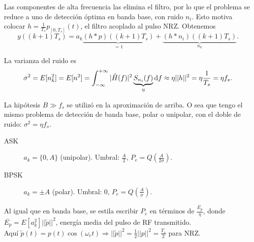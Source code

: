 Las componentes de alta frecuencia las elimina el filtro, por lo
que el problema se reduce a uno de detección óptima en banda base,
con ruido $n_i$. Esto  motiva colocar $h=\frac{1}{T_s}
p_{[0,T_s]}(t)$, el filtro acoplado al pulso NRZ. Obtenemos
\[y((k+1)T_s) = a_k \underbrace{(h\ast p)((k+1)T_s)}_{=1} + \underbrace{(h\ast n_i)((k+1)T_s)}_{n_k}.\]
\begin{center}
\end{center}
La varianza del ruido es
\[\sigma^2=E[n_k^2] = E[n^2] = \int_{-\infty}^{+\infty}|\hat{H}(f)|^2\underbrace{S_{n_i}(f)}_{\eta}\mathrm{d} f \approx \eta ||h||^2 = \eta\frac{1}{T_s} = \eta f_s.\]

La hipótesis $B\gg f_s$ se utilizó en la aproximación de arriba. %
 O sea que tengo el mismo problema
de detección de banda base, polar o unipolar, con el doble de
ruido: $\sigma^2=\eta f_s$.



\begin{description}
    \item[ASK] $a_k=\{0,A\}$ (unipolar). Umbral: $\frac{A}{2}$,
    $P_e=Q\left(\frac{A}{2\sigma}\right)$.
    \item[BPSK] $a_k=\pm A$ (polar). Umbral: $0$,
    $P_e=Q\left(\frac{A}{\sigma}\right)$.
 \end{description}

Al igual que en banda base, se estila escribir $P_e$ en términos de
$\frac{\overline{E_p}}{\eta}$, donde $\overline{E_p} =
E[a_k^2]||\tilde{p}||^2$, energía media del pulso de RF
transmitido. \\ Aquí $\tilde{p}(t) = p(t)\cos(\omega_c t)
\Longrightarrow ||\tilde{p}||^2=\frac{1}{2}||p||^2=\frac{T_s}{2}$
para NRZ.

